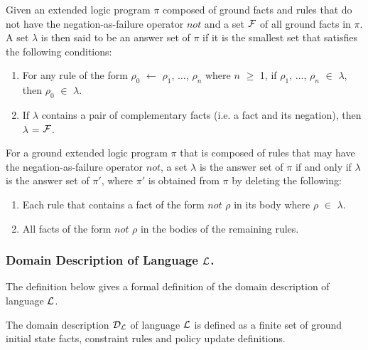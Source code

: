 \documentclass[global,twocolumn,final]{svjour}
\newenvironment{vdefinition}
  {\begin{definition}\hspace{0.25em}}
  {\end{definition}}
\begin{document}
      \begin{vdefinition}
        \label{def-ans}
        Given an extended logic program $\pi$ composed of ground facts and
        rules that do not have the negation-as-failure operator $not$ and a set
        ${\cal F}$ of all ground facts in $\pi$. A set $\lambda$ is then said to
        be an answer set of $\pi$ if it is the smallest set that satisfies the
        following conditions:

        \begin{enumerate}
          \item
            For any rule of the form $\rho_{0}$ $\leftarrow$ $\rho_{1}$,
            $\hdots$, $\rho_{n}$ where $n$ $\geq$ 1, if $\rho_{1}$, $\hdots$,
            $\rho_{n}$ $\in$ $\lambda$, then
            $\rho_{0}$ $\in$ $\lambda$.
          \item
            If $\lambda$ contains a pair of complementary facts (i.e. a fact and
            its negation), then $\lambda$ = ${\cal F}$.
        \end{enumerate}

        For a ground extended logic program $\pi$ that is composed of rules
        that may have the negation-as-failure operator $not$, a set $\lambda$ is
        the answer set of $\pi$ if and only if $\lambda$ is the answer set of
        $\pi'$, where $\pi'$ is obtained from $\pi$ by deleting the following:

        \begin{enumerate}
          \item
            Each rule that contains a fact of the form $not$ $\rho$ in its body
            where $\rho$ $\in$ $\lambda$.
          \item
            All facts of the form $not$ $\rho$ in the bodies of the remaining
            rules.
        \end{enumerate}
      \end{vdefinition}

      \subsubsection{Domain Description of Language ${\cal L}$.}

        The definition below gives a formal definition of the domain
        description of language ${\cal L}$.

        \begin{vdefinition}
          \label{def-domain}
          The domain description ${\cal D}_{\cal L}$ of language ${\cal L}$ is
          defined as a finite set of ground initial state facts, constraint
          rules and policy update definitions.
        \end{vdefinition}
\end{document}

